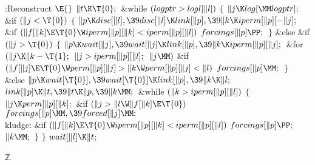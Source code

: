 \Y\B\4:Reconstruct \X${}\E{}$\6
$\|t\K\T{0};{}$\6
\&{while} ${}(\\{logptr}>\\{logl}[\|l]){}$\5
${}\{{}$\1\6
${}\|j\K\\{log}[\MM\\{logptr}];{}$\6
\&{if} ${}(\|j<\T{0}){}$\5
${}\{{}$\1\6
${}\|p\K\\{disc}[\|l],\39\\{disc}[\|l]\K\\{link}[\|p],\39\|k\K\\{iperm}[%
\|p][{-}\|j];{}$\6
\&{if} ${}(\|f[\|k]\E\T{0}\W\\{iperm}[\|p][\|k]<\\{iperm}[\|p][\|l]){}$\1\5
${}\\{forcings}[\|p]\PP;{}$\2\6
\4${}\}{}$\5
\2\&{else} \&{if} ${}(\|j>\T{0}){}$\5
${}\{{}$\1\6
${}\|p\K\\{wait}[\|j],\39\\{wait}[\|j]\K\\{link}[\|p],\39\|k\K\\{iperm}[\|p][%
\|j];{}$\6
\&{for} ${}(\|j\K\|k-\T{1};{}$ ${}\|j>\\{iperm}[\|p][\|l];{}$ ${}\|j\MM){}$\1\6
\&{if} ${}(\|f[\|j]\E\T{0}\W\\{perm}[\|p][\|j]>\|k\W\\{perm}[\|p][\|j]<\|l){}$%
\1\5
${}\\{forcings}[\|p]\MM;{}$\2\2\6
\4${}\}{}$\5
\2\&{else}\1\5
${}\|p\K\\{wait}[\T{0}],\39\\{wait}[\T{0}]\K\\{link}[\|p],\39\|k\K\|l;{}$\2\6
${}\\{link}[\|p]\K\|t,\39\|t\K\|p,\39\|k\MM;{}$\6
\&{while} ${}(\|k>\\{iperm}[\|p][\|l]){}$\5
${}\{{}$\1\6
${}\|j\K\\{perm}[\|p][\|k];{}$\6
\&{if} ${}(\|j>\|l\W\|f[\|k]\E\T{0}){}$\1\5
${}\\{forcings}[\|p]\MM,\39\\{forced}[\|j]\MM;{}$\2\6
\4\\{kludge}:\5
\&{if} ${}(\|f[\|k]\E\T{0}\W\\{iperm}[\|p][\|k]<\\{iperm}[\|p][\|l]){}$\1\5
${}\\{forcings}[\|p]\PP;{}$\2\6
${}\|k\MM;{}$\6
\4${}\}{}$\2\6
\4${}\}{}$\2\6
${}\\{wait}[\|l]\K\|t{}$;\par
\U2.\fi

